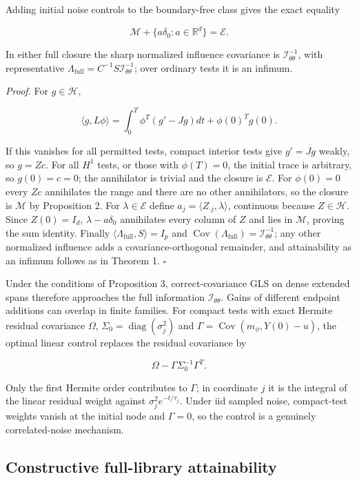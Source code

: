 \documentclass[ejs]{imsart}
\begin{document}
Adding initial noise controls to the boundary-free class gives the exact
equality

\[
\mathcal M+\{a\delta_0:a\in\mathbb R^d\}=\mathcal E.
\]

In either full closure the sharp normalized influence covariance is
\(\mathcal I_{\theta\theta}^{-1}\), with representative
\(\Lambda_{\mathrm{full}}=C^{-1}S\mathcal I_{\theta\theta}^{-1}\); over
ordinary tests it is an infimum.

\emph{Proof.} For \(g\in\mathcal H\),

\[
\langle g,L\phi\rangle
=\int_0^T\phi^T(g'-Jg)dt+\phi(0)^Tg(0).
\]

If this vanishes for all permitted tests, compact interior tests give
\(g'=Jg\) weakly, so \(g=Zc\). For all \(H^1\) tests, or those with
\(\phi(T)=0\), the initial trace is arbitrary, so \(g(0)=c=0\); the
annihilator is trivial and the closure is \(\mathcal E\). For
\(\phi(0)=0\) every \(Zc\) annihilates the range and there are no other
annihilators, so the closure is \(\mathcal M\) by Proposition 2. For
\(\lambda\in\mathcal E\) define
\(a_j=\langle Z_{\cdot j},\lambda\rangle\), continuous because
\(Z\in\mathcal H\). Since \(Z(0)=I_d\), \(\lambda-a\delta_0\)
annihilates every column of \(Z\) and lies in \(\mathcal M\), proving
the sum identity. Finally
\(\langle\Lambda_{\mathrm{full}},S\rangle=I_p\) and
\(\operatorname{Cov}(\Lambda_{\mathrm{full}})=\mathcal I_{\theta\theta}^{-1}\);
any other normalized influence adds a covariance-orthogonal remainder,
and attainability as an infimum follows as in Theorem 1. \(\square\)

Under the conditions of Proposition 3, correct-covariance GLS on dense
extended spans therefore approaches the full information
\(\mathcal I_{\theta\theta}\). Gains of different endpoint additions can
overlap in finite families. For compact tests with exact Hermite
residual covariance \(\Omega\),
\(\Sigma_0=\operatorname{diag}(\sigma_j^2)\) and
\(\Gamma=\operatorname{Cov}(m_\phi,Y(0)-u)\), the optimal linear control
replaces the residual covariance by

\[
\Omega-\Gamma\Sigma_0^{-1}\Gamma^T.
\]

Only the first Hermite order contributes to \(\Gamma\); in coordinate
\(j\) it is the integral of the linear residual weight against
\(\sigma_j^2e^{-t/\tau_j}\). Under iid sampled noise, compact-test
weights vanish at the initial node and \(\Gamma=0\), so the control is a
genuinely correlated-noise mechanism.

\subsection{Constructive full-library
attainability}\label{constructive-full-library-attainability}
\end{document}
